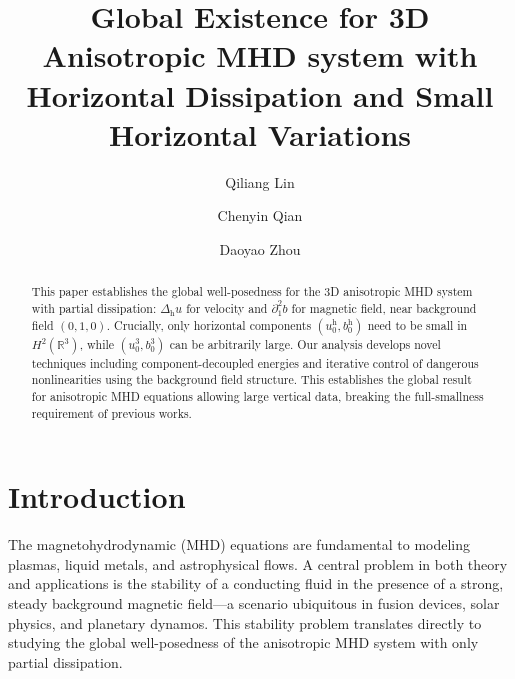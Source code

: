 \documentclass[11pt]{amsart}
\theoremstyle{definition}
\newcommand{\R}{\mathbb{R}}
\numberwithin{equation}{section}
\begin{document}
\title[3-D MHD system]{Global Existence for 3D Anisotropic MHD system with Horizontal Dissipation and Small Horizontal Variations}

\author[Q.Lin]{Qiliang Lin}
\address[Q.Lin]%
{Department of Mathematics, Zhejiang  Normal University, Jinhua, 321004, China}
\author[C. Qian]{Chenyin Qian}
\address[C. Qian]
{Department of Mathematics, Zhejiang  Normal University, Jinhua,
	321004, China}
\author[D.ZHou]{Daoyao Zhou}
\address[D.Zhou]%
{Department of Mathematics, Zhejiang  Normal University, Jinhua, 321004, China}


\begin{abstract}
This paper establishes the global well-posedness for  the 3D anisotropic MHD system with partial dissipation: $\Delta_\mathrm{h}u$ for velocity and $\partial_1^2b$ for magnetic field, near background field $(0,1,0)$. Crucially, only horizontal components $(u^\mathrm{h}_0,b^\mathrm{h}_0)$ need to be small in $H^2(\R^3)$, while $(u^3_0,b^3_0)$ can be arbitrarily large.
Our analysis develops novel techniques including component-decoupled energies and iterative control of dangerous nonlinearities using the background field structure. This establishes the  global result for anisotropic MHD equations allowing large vertical data, breaking the full-smallness requirement of previous works.
\end{abstract}

\maketitle
{}

\section{Introduction}
The magnetohydrodynamic (MHD) equations are fundamental to modeling plasmas, liquid metals, and astrophysical flows. A central problem in both theory and applications is the stability of a conducting fluid in the presence of a strong, steady background magnetic field---a scenario ubiquitous in fusion devices, solar physics, and planetary dynamos. This stability problem translates directly to studying the global well-posedness of the anisotropic MHD system with only partial dissipation.
\end{document}
